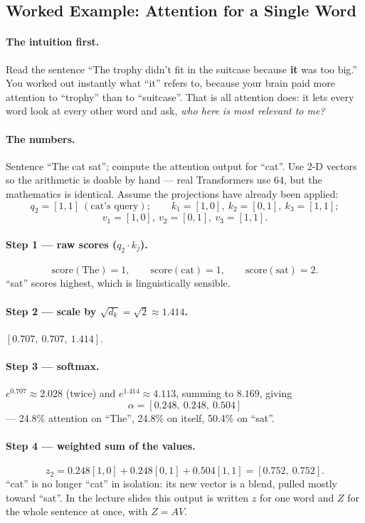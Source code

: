 \documentclass[11pt,a4paper]{article}
\begin{document}
\subsection{Worked Example: Attention for a Single Word}

\paragraph{The intuition first.} Read the sentence ``The trophy didn't fit in the suitcase
because \textbf{it} was too big.'' You worked out instantly what ``it'' refers to, because
your brain paid more attention to ``trophy'' than to ``suitcase''. That is all attention does:
it lets every word look at every other word and ask, \emph{who here is most relevant to me?}

\paragraph{The numbers.} Sentence ``The cat sat''; compute the attention output for ``cat''.
Use 2-D vectors so the arithmetic is doable by hand --- real Transformers use 64, but the
mathematics is identical. Assume the projections have already been applied:
\[
q_2 = [1,1] \ (\text{cat's query}); \qquad
k_1 = [1,0],\ k_2 = [0,1],\ k_3 = [1,1];
\]
\[
v_1 = [1,0],\ v_2 = [0,1],\ v_3 = [1,1].
\]

\paragraph{Step 1 --- raw scores ($q_2 \cdot k_j$).}
\[
\mathrm{score(The)} = 1,\qquad \mathrm{score(cat)} = 1,\qquad \mathrm{score(sat)} = 2.
\]
``sat'' scores highest, which is linguistically sensible.

\paragraph{Step 2 --- scale by $\sqrt{d_k} = \sqrt2 \approx 1.414$.}
$[0.707,\ 0.707,\ 1.414]$.

\paragraph{Step 3 --- softmax.} $e^{0.707} \approx 2.028$ (twice) and
$e^{1.414} \approx 4.113$, summing to $8.169$, giving
\[
\alpha = [0.248,\ 0.248,\ 0.504]
\]
--- 24.8\% attention on ``The'', 24.8\% on itself, 50.4\% on ``sat''.

\paragraph{Step 4 --- weighted sum of the values.}
\[
z_2 = 0.248[1,0] + 0.248[0,1] + 0.504[1,1] = [0.752,\ 0.752].
\]
``cat'' is no longer ``cat'' in isolation: its new vector is a blend, pulled mostly toward
``sat''. In the lecture slides this output is written $z$ for one word and $Z$ for the whole
sentence at once, with $Z = AV$.
\end{document}
